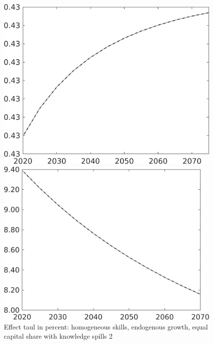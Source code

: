 \documentclass[12pt]{article}
\begin{document}
\begin{figure}[h!!]
	\centering
	\caption{Effect taul in percent: homogeneous skills, endogenous growth, equal capital share with knowledge spills 2}\label{fig:LF_BAU_nsk1_xgr0_equalcapShare_know2}
	
	\begin{minipage}[]{0.32\textwidth}
		\includegraphics[width=1\textwidth]{../../codding_model/own_basedOnFried/optimalPol_010922_revision/figures/all_13Sept22/CompTaul_Equlab_LFBAU_Reg0_EY_spillover0_nsk1_xgr0_knspil0_sep1_countec0_GovRev0_etaa0.79_lgd0.png}
	\end{minipage}	
	\begin{minipage}[]{0.32\textwidth}
		\includegraphics[width=1\textwidth]{../../codding_model/own_basedOnFried/optimalPol_010922_revision/figures/all_13Sept22/CompTaul_Equlab_LFBAU_Reg0_gAn_spillover0_nsk1_xgr0_knspil0_sep1_countec0_GovRev0_etaa0.79_lgd0.png}

\end{minipage}
\end{figure}
\end{document}
